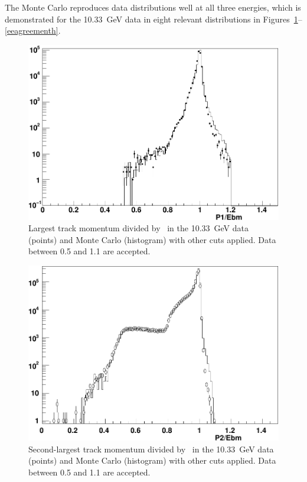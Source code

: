 \documentclass{cornell}
\begin{document}
The Monte Carlo reproduces data distributions well at all three
energies, which is demonstrated for the 10.33~GeV data in eight
relevant distributions in
Figures~\mbox{\ref{eeagreementa}--\ref{eeagreementh}}.

\begin{figure}[p]
  \begin{center}
    \includegraphics[width=0.7\linewidth]{plots/eeagreementb}
  \end{center}
  \caption{\label{eeagreementa} Largest track momentum divided by
  \ebeam\ in the 10.33~GeV data (points) and Monte Carlo (histogram)
  with other cuts applied.  Data between 0.5 and 1.1 are accepted.}
\end{figure}

\begin{figure}[p]
  \begin{center}
    \includegraphics[width=0.7\linewidth]{plots/eeagreementc}
  \end{center}
  \caption{\label{eeagreementb} Second-largest track momentum divided
  by \ebeam\ in the 10.33~GeV data (points) and Monte Carlo
  (histogram) with other cuts applied.  Data between 0.5 and 1.1 are
  accepted.}
\end{figure}
\end{document}
